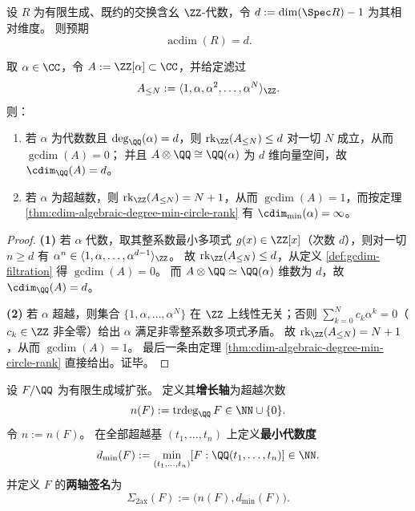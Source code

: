 \begin{conjecture}\label{conj:acdim-krull-dimension}
设 \(R\) 为有限生成、既约的交换含幺 \(\ZZ\)-代数，令
\(
d:=\dim(\Spec R)-1
\)
为其相对维度。
则预期
\[
\operatorname{acdim}(R)=d.
\]
\end{conjecture}

\begin{theorem}\label{thm:gcdim-zalpha-dichotomy}
取 \(\alpha\in\CC\)，令 \(A:=\ZZ[\alpha]\subset\CC\)，并给定滤过
\[
A_{\le N}:=\langle 1,\alpha,\alpha^2,\dots,\alpha^N\rangle_{\ZZ}.
\]
则：
\begin{enumerate}
  \item 若 \(\alpha\) 为代数数且 \(\deg_{\QQ}(\alpha)=d\)，则 \(\operatorname{rk}_{\ZZ}(A_{\le N})\le d\) 对一切 \(N\) 成立，从而 \(\operatorname{gcdim}(A)=0\)；
        并且 \(A\otimes\QQ\cong \QQ(\alpha)\) 为 \(d\) 维向量空间，故 \(\cdim_{\QQ}(A)=d\)。
  \item 若 \(\alpha\) 为超越数，则 \(\operatorname{rk}_{\ZZ}(A_{\le N})=N+1\)，从而 \(\operatorname{gcdim}(A)=1\)，而按定理 \ref{thm:cdim-algebraic-degree-min-circle-rank} 有 \(\cdim_{\min}(\alpha)=\infty\)。
\end{enumerate}
\end{theorem}
\begin{proof}
\textbf{(1)} 若 \(\alpha\) 代数，取其整系数最小多项式 \(g(x)\in\ZZ[x]\)（次数 \(d\)），则对一切 \(n\ge d\) 有 \(\alpha^n\in \langle 1,\alpha,\dots,\alpha^{d-1}\rangle_{\ZZ}\)。
故 \(\operatorname{rk}_{\ZZ}(A_{\le N})\le d\)，从定义 \ref{def:gcdim-filtration} 得 \(\operatorname{gcdim}(A)=0\)。
而 \(A\otimes\QQ\simeq \QQ(\alpha)\) 维数为 \(d\)，故 \(\cdim_{\QQ}(A)=d\)。
\par
\textbf{(2)} 若 \(\alpha\) 超越，则集合 \(\{1,\alpha,\dots,\alpha^N\}\) 在 \(\ZZ\) 上线性无关；否则 \(\sum_{k=0}^{N}c_k\alpha^k=0\)（\(c_k\in\ZZ\) 非全零）给出 \(\alpha\) 满足非零整系数多项式矛盾。
故 \(\operatorname{rk}_{\ZZ}(A_{\le N})=N+1\)，从而 \(\operatorname{gcdim}(A)=1\)。
最后一条由定理 \ref{thm:cdim-algebraic-degree-min-circle-rank} 直接给出。证毕。
\end{proof}

\begin{definition}\label{def:gcdim-two-axis-signature}
设 \(F/\QQ\) 为有限生成域扩张。
定义其\textbf{增长轴}为超越次数
\[
n(F):=\operatorname{trdeg}_{\QQ}F\in\NN\cup\{0\}.
\]
令 \(n:=n(F)\)。
在全部超越基 \((t_1,\dots,t_n)\) 上定义\textbf{最小代数度}
\[
d_{\min}(F):=\min_{(t_1,\dots,t_n)}[F:\QQ(t_1,\dots,t_n)]\in\NN.
\]
并定义 \(F\) 的\textbf{两轴签名}为
\[
\Sigma_{\mathrm{2ax}}(F):=\bigl(n(F),d_{\min}(F)\bigr).
\]
\end{definition}

